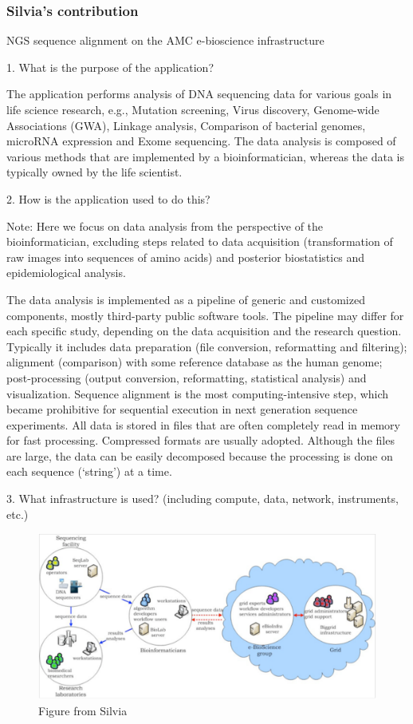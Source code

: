\documentclass[preprint,12pt]{article}
\begin{document}
\subsubsection{Silvia's contribution}

NGS sequence alignment on the AMC e-bioscience infrastructure

1. What is the purpose of the application?

The application performs analysis of DNA sequencing data for various goals in life science research, e.g., Mutation screening, Virus discovery, Genome-wide Associations (GWA), Linkage analysis, Comparison of bacterial genomes, microRNA expression and Exome sequencing. The data analysis is composed of various methods that are implemented by a bioinformatician, whereas the data is typically owned by the life scientist.

2. How is the application used to do this?

Note: Here we focus on data analysis from the perspective of the bioinformatician, excluding steps related to data acquisition (transformation of raw images into sequences of amino acids) and posterior biostatistics and epidemiological analysis.

The data analysis is implemented as a pipeline of generic and customized components, mostly third-party public software tools. The pipeline may differ for each specific study, depending on the data acquisition and the research question. Typically it includes data preparation (file conversion, reformatting and filtering); alignment (comparison) with some reference database as the human genome; post-processing (output conversion, reformatting, statistical analysis) and visualization. Sequence alignment is the most computing-intensive step, which became prohibitive for sequential execution in next generation sequence experiments. All data is stored in files that are often completely read in memory for fast processing. Compressed formats are usually adopted. Although the files are large, the data can be easily decomposed because the processing is done on each sequence (`string') at a time.


3. What infrastructure is used? (including compute, data, network, instruments, etc.)

\begin{figure}[htbp]
  \begin{center}
    \includegraphics[width=\textwidth]{figures/silvia.pdf}
    \caption{Figure from Silvia}
    \label{Fig:silvia}
  \end{center}
\end{figure}
\end{document}
